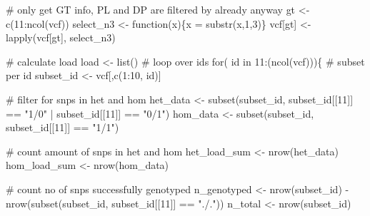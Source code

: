 \documentclass[
  letterpaper,
  DIV=11,
  numbers=noendperiod]{scrreprt}
\newenvironment{Shaded}{}{}
\newcommand{\CommentTok}[1]{\textcolor[rgb]{0.42,0.45,0.49}{#1}}
\newcommand{\ControlFlowTok}[1]{\textcolor[rgb]{0.84,0.23,0.29}{#1}}
\newcommand{\DecValTok}[1]{\textcolor[rgb]{0.00,0.36,0.77}{#1}}
\newcommand{\FunctionTok}[1]{\textcolor[rgb]{0.44,0.26,0.76}{#1}}
\newcommand{\NormalTok}[1]{\textcolor[rgb]{0.14,0.16,0.18}{#1}}
\newcommand{\OtherTok}[1]{\textcolor[rgb]{0.44,0.26,0.76}{#1}}
\newcommand{\SpecialCharTok}[1]{\textcolor[rgb]{0.00,0.36,0.77}{#1}}
\newcommand{\StringTok}[1]{\textcolor[rgb]{0.01,0.18,0.38}{#1}}
\begin{document}
\begin{Shaded}
\begin{Highlighting}[]
  \CommentTok{\# only get GT info, PL and DP are filtered by already anyway }
\NormalTok{  gt }\OtherTok{\textless{}{-}} \FunctionTok{c}\NormalTok{(}\DecValTok{11}\SpecialCharTok{:}\FunctionTok{ncol}\NormalTok{(vcf))}
\NormalTok{  select\_n3 }\OtherTok{\textless{}{-}} \ControlFlowTok{function}\NormalTok{(x)\{x }\OtherTok{=} \FunctionTok{substr}\NormalTok{(x,}\DecValTok{1}\NormalTok{,}\DecValTok{3}\NormalTok{)\}}
\NormalTok{  vcf[gt] }\OtherTok{\textless{}{-}} \FunctionTok{lapply}\NormalTok{(vcf[gt], select\_n3)}
  
  \CommentTok{\# calculate load}
\NormalTok{  load }\OtherTok{\textless{}{-}} \FunctionTok{list}\NormalTok{()}
  \CommentTok{\# loop over ids}
  \ControlFlowTok{for}\NormalTok{( id }\ControlFlowTok{in} \DecValTok{11}\SpecialCharTok{:}\NormalTok{(}\FunctionTok{ncol}\NormalTok{(vcf)))\{}
    \CommentTok{\# subset per id}
\NormalTok{    subset\_id }\OtherTok{\textless{}{-}}\NormalTok{ vcf[,}\FunctionTok{c}\NormalTok{(}\DecValTok{1}\SpecialCharTok{:}\DecValTok{10}\NormalTok{, id)]}
    
    \CommentTok{\# filter for snps in het and hom}
\NormalTok{    het\_data }\OtherTok{\textless{}{-}} \FunctionTok{subset}\NormalTok{(subset\_id, subset\_id[[}\DecValTok{11}\NormalTok{]] }\SpecialCharTok{==} \StringTok{"1/0"} \SpecialCharTok{|}\NormalTok{ subset\_id[[}\DecValTok{11}\NormalTok{]] }\SpecialCharTok{==} \StringTok{"0/1"}\NormalTok{)}
\NormalTok{    hom\_data }\OtherTok{\textless{}{-}} \FunctionTok{subset}\NormalTok{(subset\_id, subset\_id[[}\DecValTok{11}\NormalTok{]] }\SpecialCharTok{==} \StringTok{"1/1"}\NormalTok{)}
    
    \CommentTok{\# count amount of snps in het and hom}
\NormalTok{    het\_load\_sum }\OtherTok{\textless{}{-}} \FunctionTok{nrow}\NormalTok{(het\_data)}
\NormalTok{    hom\_load\_sum }\OtherTok{\textless{}{-}} \FunctionTok{nrow}\NormalTok{(hom\_data)}
    
    \CommentTok{\# count no of snps successfully genotyped}
\NormalTok{    n\_genotyped }\OtherTok{\textless{}{-}} \FunctionTok{nrow}\NormalTok{(subset\_id) }\SpecialCharTok{{-}} \FunctionTok{nrow}\NormalTok{(}\FunctionTok{subset}\NormalTok{(subset\_id, subset\_id[[}\DecValTok{11}\NormalTok{]] }\SpecialCharTok{==} \StringTok{"./."}\NormalTok{))}
\NormalTok{    n\_total }\OtherTok{\textless{}{-}} \FunctionTok{nrow}\NormalTok{(subset\_id)}
    

\end{Highlighting}
\end{Shaded}
\end{document}
